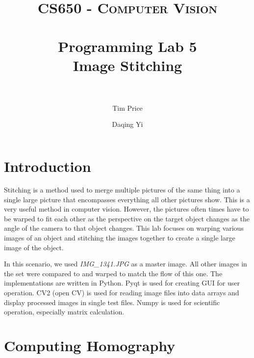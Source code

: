 \documentclass[paper=a4, fontsize=11pt]{scrartcl}
\title{
		\usefont{OT1}{bch}{b}{n}
		\normalfont \normalsize \textsc{CS650 - Computer Vision} \\ [25pt]
		\horrule{0.5pt} \\[0.4cm]
		\huge Programming Lab 5 \\ Image Stitching \\
		\horrule{2pt} \\[0.5cm]
}
\author{
		\normalfont %
        Tim Price \and Daqing Yi \\
}
\begin{document}
\maketitle

\section{Introduction}
Stitching is a method used to merge multiple pictures of the same thing into a single large picture that encompasses everything all other pictures show.  
This is a very useful method in computer vision. 
However, the pictures often times have to be warped to fit each other as the perspective on the target object changes as the angle of the camera to that object changes.  
This lab focuses on warping various images of an object and stitching the images together to create a single large image of the object.

In this scenario, we used \emph{IMG\_1341.JPG} as a master image.
All other images in the set were compared to and warped to match the flow of this one.
The implementations are written in Python.
Pyqt is used for creating GUI for user operation.
CV2 (open CV) is used for reading image files into data arrays and display processed images in single test files.
Numpy is used for scientific operation, especially matrix calculation.

\section{Computing Homography}
\end{document}
